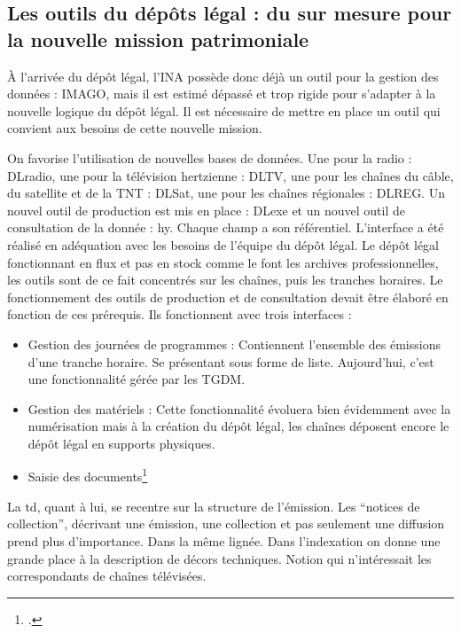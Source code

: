 \subsection{Les outils du dépôts légal : du sur mesure pour la nouvelle mission patrimoniale}


À l'arrivée du dépôt légal, l'INA possède donc déjà un outil pour la gestion des données : IMAGO, mais il est estimé dépassé et trop rigide pour s'adapter à la nouvelle logique du dépôt légal. Il est nécessaire de mettre en place un outil qui convient aux besoins de cette nouvelle mission. 


On favorise l'utilisation de nouvelles bases de données. Une pour la radio : DLradio, une pour la télévision hertzienne : DLTV, une pour les chaînes du câble, du satellite et de la TNT : DLSat, une pour les chaînes régionales : DLREG. Un nouvel outil de production est mis en place : DLexe et un nouvel outil de consultation de la donnée : \gls{hy}. Chaque champ a son référentiel. L'interface a été réalisé en adéquation avec les besoins de l'équipe du dépôt légal. Le dépôt légal fonctionnant en flux et pas en stock comme le font les archives professionnelles, les outils sont de ce fait concentrés sur les chaînes, puis les tranches horaires. Le fonctionnement des outils de production et de consultation devait être élaboré en fonction de ces prérequis. Ils fonctionnent avec trois interfaces : 
\begin{itemize}
	\item Gestion des journées de programmes : Contiennent l'ensemble des émissions d'une tranche horaire. Se présentant sous forme de liste. Aujourd'hui, c'est une fonctionnalité gérée par les TGDM.
	\item Gestion des matériels : Cette fonctionnalité évoluera bien évidemment avec la numérisation mais à la création du dépôt légal, les chaînes déposent encore le dépôt légal en supports physiques. 
	\item Saisie des documents\footcite[]{Rodes1994}
\end{itemize}
La \gls{td}, quant à lui, se recentre sur la structure de l'émission. Les \enquote{notices de collection}, décrivant une émission, une collection et pas seulement une diffusion prend plus d'importance. Dans la même lignée. Dans l'indexation on donne une grande place à la description de décors techniques. Notion qui n'intéressait les correspondants de chaînes télévisées. 

